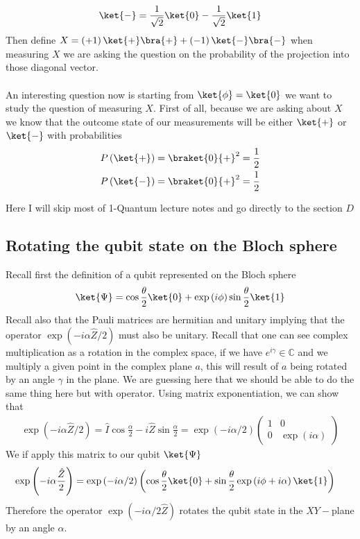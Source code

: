 \begin{parag}{$ $}
	\begin{align*} 
		\ket{-} = \frac{1}{\sqrt{2}}  \ket{0} - \frac{1}{\sqrt{2}} \ket{1}
	\end{align*}
	Then define $X = \left(+1\right)\ket{+}\bra{+} + \left(-1\right)\ket{-}\bra{-}$ when measuring $X$ we are asking the question on the probability of the projection into those diagonal vector.\\
	$ $\\
	An interesting question now is starting from $\ket{\phi} = \ket{0}$ we want to study the question of measuring $X$. First of all, because we are asking about $X$ we know that the outcome state of our measurements will be either $\ket{+}$ or $\ket{-}$ with probabilities 
	\begin{align*} 
		P\left(\ket{+}\right)  &= \braket{0}{+}^2 = \frac{1}{2}\\
		P\left(\ket{-}\right)  &= \braket{0}{+}^2 = \frac{1}{2}
	\end{align*}
\end{parag}

Here I will skip most of 1-Quantum lecture notes and go directly to the section $D$

\subsection{Rotating the qubit state on the Bloch sphere}
Recall first the definition of a qubit represented on the Bloch sphere 
\begin{align*} 
	\ket{\Psi} = \cos \frac{\theta}{2} \ket{0} + \exp\left(i \phi\right) \sin\frac{\theta}{2}\ket{1} 
\end{align*} 
Recall also that the Pauli matrices are hermitian and unitary implying that the operator $\exp\left(-i \alpha \hat{Z}/2\right)$ must also be unitary. Recall that one can see complex multiplication as a rotation in the complex space, if we have $e^{i \gamma} \in \mathbb{C}$ and we multiply a given point in the complex plane $a$, this will result of $a$ being rotated by an angle $\gamma$ in the plane. We are guessing here that we should be able to do the same thing here but with operator. Using matrix exponentiation, we can show that 
\begin{align*} 
	\exp\left(-i\alpha \hat{Z}/2\right)  =  \hat{I}\cos \frac{\alpha}{2} - i \hat{Z} \sin \frac{\alpha}{2} = \exp\left(-i \alpha /2\right) \begin{pmatrix} 1 & 0 \\ 0 & \exp\left(i\alpha\right) \end{pmatrix} 
\end{align*}
We if apply this matrix to our qubit $\ket{\Psi}$
\begin{align*} 
	\exp\left(-i \alpha \frac{\hat{Z}}{2}\right)  &=  \exp\left(-i\alpha /2\right)\left(\cos \frac{\theta}{2} \ket{0} + \sin\frac{\theta}{2}\exp\left(i \phi + i \alpha\right)\ket{1}\right)
\end{align*}
Therefore the operator $\exp\left(-i\alpha /2 \hat{Z}\right)$ rotates the qubit state in the $XY-$plane by an angle $\alpha$.





